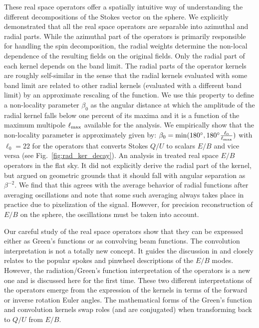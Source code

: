 \documentclass[a4paper,11pt]{article}
\def\fig#1{{Fig.~\ref{#1}}}
\begin{document}
These real space operators offer a spatially intuitive way of understanding the different decompositions of the Stokes vector on the sphere. We explicitly  demonstrated that all the real space operators are separable into azimuthal and radial parts. While the azimuthal part of the operators is primarily responsible for handling the spin decomposition, the radial weights determine the non-local dependence of the resulting fields on the original fields.  Only the radial part of each kernel depends on the band limit. 
The radial parts of the operator kernels are roughly self-similar in the sense that the radial kernels evaluated with some band limit are related to other radial kernels (evaluated with a different band limit) by an approximate rescaling of the function. We use this property to define a non-locality parameter $\beta_0$ as the angular distance at which the amplitude of the radial kernel falls below one percent of its maxima and it  is a function of the maximum multipole $\ell_{\rm max}$ available for the analysis. We empirically show that the non-locality parameter is approximately given by: $\beta_0 = \mathrm{min}(180^{\circ}, 180^{\circ} \frac{\ell_{0}}{\ell_{\rm max}})$ with $\ell_{0}=22$ for the operators that converts Stokes $Q/U$ to scalars $E/B$ and vice versa (see \fig{fig:rad_ker_decay}). An analysis in  \cite{Zaldarriaga2001a} treated real space $E/B$ operators in the flat sky.  It did not explicitly derive the radial part of the kernel, but argued on geometric grounds that it should fall with angular separation as $\beta^{-2}$.  We find that this agrees with the average behavior of radial functions after averaging oscillations and note that some such averaging always takes place in practice due to pixelization of the signal.  However, for precision reconstruction of $E/B$ on the sphere, the oscillations must be taken into account.

Our careful study of the real space operators show that they can be expressed either as Green's functions or as convolving beam functions.  The convolution interpretation is not a totally new concept.  It guides the discussion in \cite{Zaldarriaga2001a,Chiueh2002} and closely relates to the popular spokes and pinwheel descriptions of the $E/B$ modes. However, the radiation/Green's function interpretation of the operators is a new one and is discussed here for the first time. These two different interpretations of the operators emerge from the expression of the kernels in terms of the forward or inverse rotation Euler angles.  The mathematical forms of the Green's function and convolution kernels swap roles (and are conjugated) when transforming back to $Q/U$ from $E/B$.
\end{document}
